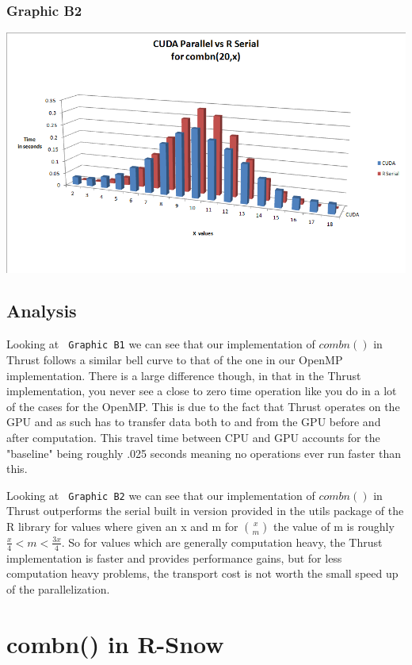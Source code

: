 \documentclass[titlepage, 11pt]{article}
\begin{document}
\subsubsection{Graphic B2}
\includegraphics[scale = 0.5]{ThrustvsR.png}

\subsection{Analysis}
Looking at \verb; Graphic B1; we can see that our implementation of $combn()$ in Thrust follows a similar bell curve to that of the one in our OpenMP implementation. There is a large difference though, in that in the Thrust implementation, you never see a close to zero time operation like you do in a lot of the cases for the OpenMP. This is due to the fact that Thrust operates on the GPU and as such has to transfer data both to and from the GPU before and after computation. This travel time between CPU and GPU accounts for the "baseline" being roughly .025 seconds meaning no operations ever run faster than this.

Looking at \verb; Graphic B2; we can see that our implementation of $combn()$ in Thrust outperforms the serial built in version provided in the utils package of the R library for values where given an x and m for ${x \choose m}$ the value of m is roughly $\frac{x}{4} < m < \frac{3x}{4}$. So for values which are generally computation heavy, the Thrust implementation is faster and provides performance gains, but for less computation heavy problems, the transport cost is not worth the small speed up of the parallelization.

\section{combn() in R-Snow}
\end{document}
